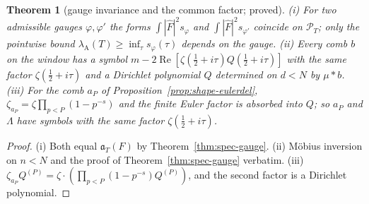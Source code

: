 \documentclass[11pt]{amsart}
\newtheorem{theorem}{Theorem}[section]
\theoremstyle{definition}
\theoremstyle{remark}
\newcommand{\Rel}{\operatorname{Re}}
\newcommand{\PT}{\mathcal P_T}
\newcommand{\lamA}{\lambda_{\mathrm A}(T)}
\newcommand{\Fh}{\widehat F}
\begin{document}
\begin{theorem}[gauge invariance and the common factor; proved]\label{thm:spec-carrier}
(i) For two admissible gauges $\varphi,\varphi'$ the forms $\int|\Fh|^2s_\varphi$ and $\int|\Fh|^2s_{\varphi'}$ coincide on $\PT$; only
the pointwise bound $\lamA\ge\inf_\tau s_\varphi(\tau)$ depends on the gauge. (ii) Every comb $b$ on the window has a symbol
$m-2\Rel[\zeta(\frac12+i\tau)Q(\frac12+i\tau)]$ with the same factor $\zeta(\frac12+i\tau)$ and a Dirichlet polynomial $Q$ determined on
$d<N$ by $\mu*b$. (iii) For the comb $a_P$ of Proposition~\ref{prop:shape-eulerdel}, $\zeta_{a_P}=\zeta\prod_{p<P}(1-p^{-s})$ and the
finite Euler factor is absorbed into $Q$; so $a_P$ and $\Lambda$ have symbols with the same factor $\zeta(\frac12+i\tau)$.
\end{theorem}
\begin{proof}
(i) Both equal $\mathfrak a_T(F)$ by Theorem~\ref{thm:spec-gauge}. (ii) Möbius inversion on $n<N$ and the proof of
Theorem~\ref{thm:spec-gauge} verbatim. (iii) $\zeta_{a_P}Q^{(P)}=\zeta\cdot(\prod_{p<P}(1-p^{-s})Q^{(P)})$, and the second factor is a
Dirichlet polynomial.
\end{proof}
\end{document}
